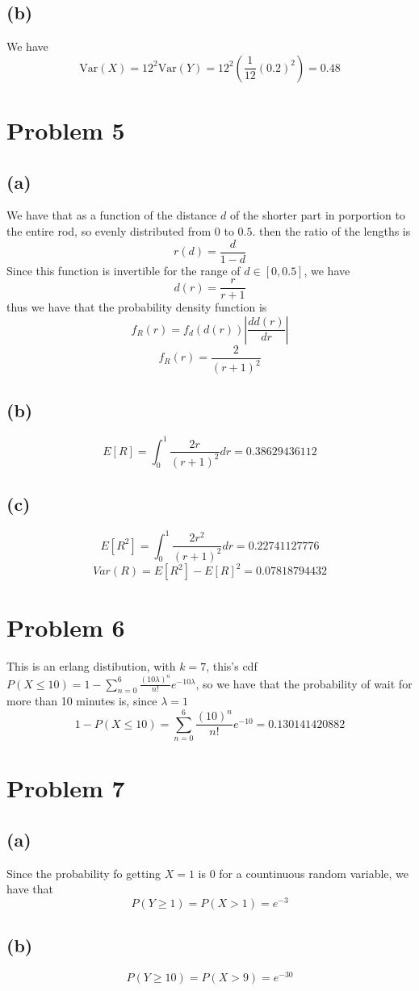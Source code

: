 \subsection*{(b)}
We have
$$\text{Var}(X)=12^2\text{Var}(Y)=12^2\left(\frac{1}{12}(0.2)^2\right)=0.48$$
\section*{Problem 5}
\subsection*{(a)}
We have that as a function of the distance $d$ of the shorter part in porportion
to the entire rod,
so evenly distributed from $0$ to $0.5$. then the ratio of the lengths is
$$r(d)=\frac{d}{1-d}$$ 
Since this function is invertible for the range of $d\in[0,0.5]$, we have
$$d(r)=\frac{r}{r+1}$$
thus we have that the probability density function is
$$f_R(r)=f_d(d(r))\left|\frac{d d(r)}{dr}\right|$$
$$f_R(r)=\boxed{\frac{2}{(r+1)^2}}$$
\subsection*{(b)}
$$E[R]=\int_{0}^{1}\frac{2r}{(r+1)^2}dr=0.38629436112$$
\subsection*{(c)}
$$E[R^2]=\int_{0}^{1}\frac{2r^2}{(r+1)^2}dr=0.22741127776$$
$$Var(R)=E[R^2]-E[R]^2=\boxed{0.07818794432}$$
\section*{Problem 6}
This is an erlang distibution, with $k=7$, this's cdf 
$P(X\leq 10)=1-\sum_{n=0}^{6}\frac{(10\lambda)^n}{n!}e^{-10\lambda}$, so we have
that the probability of wait for more than 10 minutes is, since $\lambda=1$
$$1-P(X\leq 10)=\boxed{\sum_{n=0}^{6}\frac{(10)^n}{n!}e^{-10}=0.130141420882}$$
\section*{Problem 7}
\subsection*{(a)}
Since the probability fo getting $X=1$ is $0$ for a countinuous random variable,
we have that 
$$P(Y\geq1)=P(X>1)=\boxed{e^{-3}}$$
\subsection*{(b)}
$$P(Y\geq10)=P(X>9)=\boxed{e^{-30}}$$
